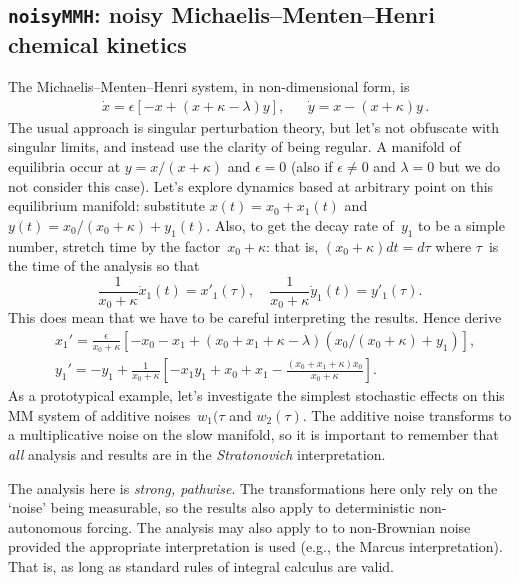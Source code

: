 \subsection{\texttt{noisyMMH}: noisy Michaelis--Menten--Henri chemical kinetics} 
\label{nonautoTwo}
\def\b#1{\color{blue}{}#1\color{black}{}}
\def\dash#1{#1'}%


The Michaelis--Menten--Henri system, in non-dimensional form, is
\begin{align*}
&\dot x=\epsilon[-x+(x+\kappa-\lambda)y],
&&\dot y=x-(x+\kappa)y\,.
\end{align*}
The usual approach is singular perturbation theory, but let's not obfuscate with singular limits, and instead use the clarity of being regular.
A manifold of equilibria occur at \(y=x/(x+\kappa)\) and \(\epsilon=0\)  (also if \(\epsilon\neq 0\) and \(\lambda=0\) but we do not consider this case).
Let's explore dynamics based at arbitrary point on this equilibrium manifold:
substitute \(x(t)=x_0+x_1(t)\) and \(y(t)=x_0/(x_0+\kappa)+y_1(t)\).
Also, to get the decay rate of~\(y_1\) to be a simple number, stretch time by the factor~\(x_0+\kappa\): that is, \((x_0+\kappa)dt=d\tau\) where \(\tau\)~is the time of the analysis so that
\begin{equation*}
\frac1{x_0+\kappa}\dot x_1(t)=x'_1(\tau),\quad
\frac1{x_0+\kappa}\dot y_1(t)=y'_1(\tau).
\end{equation*}
This does mean that we have to be careful interpreting the results.  Hence derive
\begin{align*}&
x_1'=\frac\epsilon{x_0+\kappa}\left[
-x_0-x_1+(x_0+x_1+\kappa-\lambda)(x_0/(x_0+\kappa)+y_1)
\right],
\\&
y_1'=-y_1+\frac1{x_0+\kappa}\left[
-x_1y_1+x_0+x_1-\frac{(x_0+x_1+\kappa)x_0}{x_0+\kappa}\right].
\end{align*}
As a prototypical example, let's investigate the simplest
stochastic effects on this MM system of additive noises~\(w_1(\tau\) and \(w_2(\tau)\). The
additive noise transforms to a multiplicative noise on
the slow manifold, so it is important to remember that
\emph{all} analysis and results are in the
\emph{Stratonovich} interpretation.

The analysis here is \emph{strong, pathwise}.
The transformations here only rely on the `noise' being
measurable, so the results also apply to deterministic
non-autonomous forcing. The analysis may also apply to to
non-Brownian noise provided the appropriate interpretation
is used (e.g., the Marcus interpretation).  That is, as long
as standard rules of integral calculus are valid.

